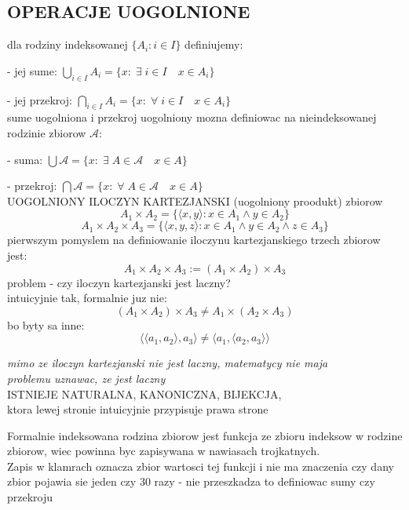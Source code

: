 \documentclass{article}
\begin{document}
\subsection*{\color{tit}OPERACJE UOGOLNIONE}
  dla \color{def}rodziny indeksowanej \color{txt}$\{A_i:i\in I\}$ definiujemy:\smallskip\par
  - jej sume: $\bigcup\limits_{i\in I}A_i=\{x:\;\exists\;i\in I \quad x\in A_i\}$\smallskip\par
  - jej przekroj: $\bigcap\limits_{i\in I}A_i=\{x:\;\forall\; i\in I\quad x\in A_i\}$\medskip\\
  sume uogolniona i przekroj uogolniony mozna definiowac na nieindeksowanej \color{acc}rodzinie zbiorow $\mathcal{A}$\color{txt}:\smallskip\par
  - suma: $\bigcup\mathcal{A}=\{x:\;\exists\;A\in\mathcal{A}\quad x\in A\}$\smallskip\par
  - przekroj: $\bigcap\mathcal{A}=\{x:\;\forall\; A\in\mathcal{A}\quad x\in A\}$\medskip\\
  \color{def}UOGOLNIONY ILOCZYN KARTEZJANSKI \color{txt}(uogolniony proodukt) zbiorow\\
  $$A_1\times A_2 =\{\langle x,y\rangle : x\in A_1 \land y\in A_2\}$$
  $$A_1\times A_2\times A_3 =\{\langle x,y, z\rangle : x\in A_1 \land y\in A_2\land z\in A_3\}$$
  pierwszym pomyslem na definiowanie iloczynu kartezjanskiego trzech zbiorow jest:
  $$A_1\times A_2\times A_3 :=(A_1\times A_2)\times A_3$$
  \color{emp}problem \color{txt}- czy iloczyn kartezjanski jest laczny?\\
  intuicyjnie tak, formalnie juz nie:
  $$(A_1\times A_2)\times A_3\neq A_1\times (A_2\times A_3)$$
  bo byty sa inne:
  $$\langle\langle a_1, a_2\rangle, a_3\rangle \neq \langle a_1, \langle a_2, a_3\rangle\rangle$$\medskip
  \begin{center}\emph{\color{emp}mimo ze iloczyn kartezjanski nie jest laczny, matematycy nie maja \\problemu uznawac, ze jest laczny}\smallskip\\
  \color{def}ISTNIEJE NATURALNA, KANONICZNA, BIJEKCJA\color{txt}, \\ktora lewej stronie intuicyjnie przypisuje prawa strone\end{center}
  Formalnie \color{acc}indeksowana rodzina zbiorow \color{txt}jest funkcja ze zbioru indeksow w rodzine zbiorow, wiec powinna byc zapisywana w \color{acc}nawiasach trojkatnych. \color{txt}\\
  Zapis w \color{acc}klamrach oznacza zbior wartosci \color{txt}tej funkcji i nie ma znaczenia czy dany zbior pojawia sie jeden czy 30 razy - nie przeszkadza to definiowac sumy czy przekroju\medskip\\
\end{document}
